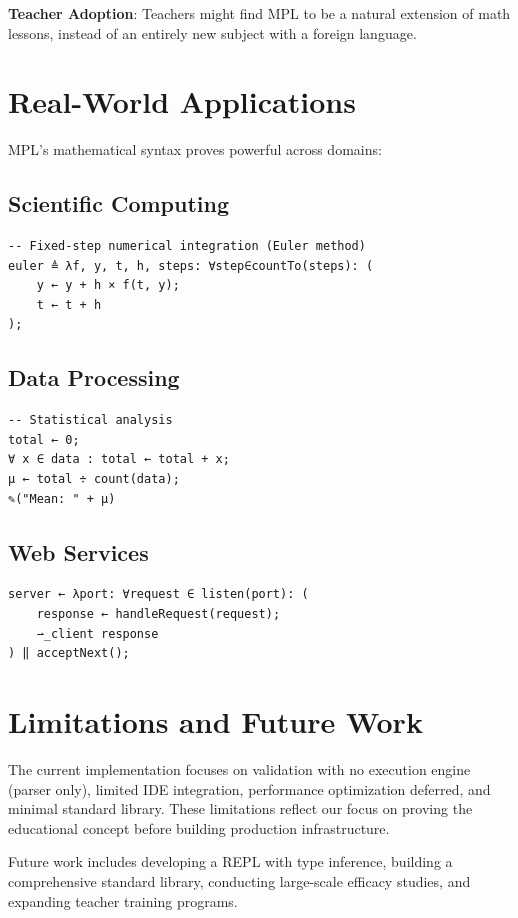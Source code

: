 \documentclass[10pt,conference]{IEEEtran}
\begin{document}
\textbf{Teacher Adoption}: Teachers might find MPL to be a natural extension of math lessons, instead of an entirely new subject with a foreign language.

\section{Real-World Applications}

MPL's mathematical syntax proves powerful across domains:

\subsection{Scientific Computing}
\begin{lstlisting}[language=MPL]
-- Fixed-step numerical integration (Euler method)
euler ≜ λf, y, t, h, steps: ∀step∈countTo(steps): (
    y ← y + h × f(t, y);
    t ← t + h
);
\end{lstlisting}

\subsection{Data Processing}
\begin{lstlisting}[language=MPL]
-- Statistical analysis
total ← 0;
∀ x ∈ data : total ← total + x;
μ ← total ÷ count(data);
✎("Mean: " + μ)
\end{lstlisting}

\subsection{Web Services}
\begin{lstlisting}[language=MPL]
server ← λport: ∀request ∈ listen(port): (
    response ← handleRequest(request);
    ⇀_client response
) ‖ acceptNext();
\end{lstlisting}

\section{Limitations and Future Work}

The current implementation focuses on validation with no execution engine (parser only), limited IDE integration, performance optimization deferred, and minimal standard library. These limitations reflect our focus on proving the educational concept before building production infrastructure.

Future work includes developing a REPL with type inference, building a comprehensive standard library, conducting large-scale efficacy studies, and expanding teacher training programs.
\end{document}
